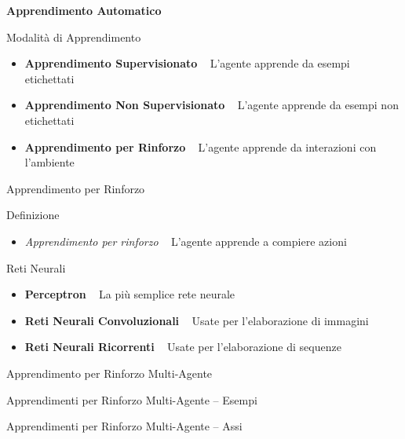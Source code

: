 \documentclass[presentation, 10pt,aspectratio=169]{beamer}\mode<presentation>{\usetheme{AMSBolognaFC}}
\begin{document}
	{

	
	\begin{frame}[c]
		
		{
		\color{customfg}
	
		\begin{center}
		\Large\textbf{Apprendimento Automatico} \\
		
		\end{center}
	
		\vspace{1cm}	
	}
\end{frame}
}
\begin{frame}{Modalità di Apprendimento}
	\begin{itemize}
		\item \textbf{Apprendimento Supervisionato} \faArrowRight ~ L'agente apprende da esempi etichettati
		\item \textbf{Apprendimento Non Supervisionato} \faArrowRight ~ L'agente apprende da esempi non etichettati
		\item \textbf{Apprendimento per Rinforzo} \faArrowRight ~ L'agente apprende da interazioni con l'ambiente
	\end{itemize}
\end{frame}
\begin{frame}{Apprendimento per Rinforzo}
	\begin{alertblock}{Definizione}
		\begin{itemize}
			\item \emph{Apprendimento per rinforzo} \faArrowRight ~ L'agente apprende a compiere azioni
		\end{itemize}
	\end{alertblock}
\end{frame}
\begin{frame}{Reti Neurali}
	\begin{itemize}
		\item \textbf{Perceptron} \faArrowRight ~ La più semplice rete neurale
		\item \textbf{Reti Neurali Convoluzionali} \faArrowRight ~ Usate per l'elaborazione di immagini
		\item \textbf{Reti Neurali Ricorrenti} \faArrowRight ~ Usate per l'elaborazione di sequenze
	\end{itemize}
\end{frame}
\begin{frame}{Apprendimento per Rinforzo Multi-Agente}

\end{frame}
\begin{frame}{Apprendimenti per Rinforzo Multi-Agente -- Esempi}

\end{frame}
\begin{frame}{Apprendimenti per Rinforzo Multi-Agente -- Assi}

\end{frame}
\end{document}
